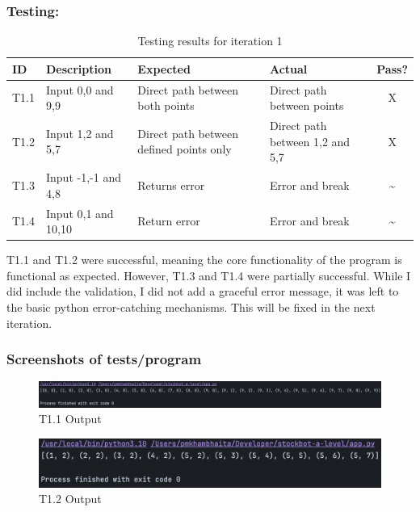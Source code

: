 \subsubsection{Testing:}
\begin{table}[htbp]
\centering
\begin{tabularx}{\textwidth}{|l|X|p{3.5cm}|p{3.5cm}|c|}
\hline
\textbf{ID} & \textbf{Description} & \textbf{Expected} & \textbf{Actual} & \textbf{Pass?} \\
\hline
T1.1 & Input 0,0 and 9,9 & Direct path between both points & Direct path between points & X \\
\hline
T1.2 & Input 1,2 and 5,7 & Direct path between defined points only & Direct path between 1,2 and 5,7 & X \\
\hline
T1.3 & Input -1,-1 and 4,8 & Returns error & Error and break & \~{} \\
\hline
T1.4 & Input 0,1 and 10,10 & Return error & Error and break & \~{} \\
\hline

\end{tabularx}
\caption{Testing results for iteration 1}
\end{table}
\textbf{}\newline
T1.1 and T1.2 were successful, meaning the core functionality of the program is functional as expected. However, T1.3 and T1.4 were partially successful. While I did include the validation, I did not add a graceful error message, it was left to the basic python error-catching mechanisms. This will be fixed in the next iteration.

\newpage

\subsubsection{Screenshots of tests/program}

\begin{figure}[htbp!]
    \centering
    \includegraphics[width=1\linewidth]{Images/t1.1.png}
    \caption{T1.1 Output}
    \label{fig:enter-label}
\end{figure}

\begin{figure}[htbp!]
    \centering
    \includegraphics[width=1\linewidth]{Images/t1.2.png}
    \caption{T1.2 Output}
    \label{fig:enter-label}
\end{figure}


